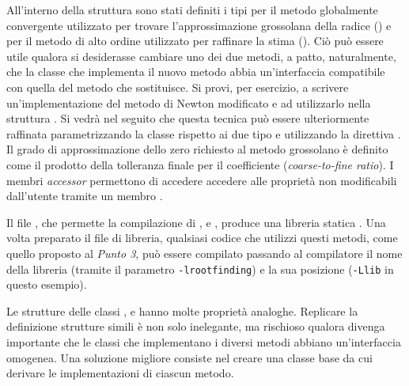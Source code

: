 \begin{enumerate}
        All'interno della struttura  sono stati definiti i tipi
        per il metodo globalmente convergente utilizzato per trovare
        l'approssimazione grossolana della radice () e per il
        metodo di alto ordine utilizzato per raffinare la stima
        (). Ci\`o pu\`o essere utile qualora si desiderasse
        cambiare uno dei due metodi, a patto, naturalmente, che la classe che
        implementa il nuovo metodo abbia un'interfaccia compatibile con quella
        del metodo che sostituisce. Si provi, per esercizio, a scrivere
        un'implementazione del metodo di Newton modificato e ad utilizzarlo
        nella struttura . Si vedr\`a nel seguito che questa
        tecnica pu\`o essere ulteriormente raffinata parametrizzando la classe
         rispetto ai due tipo  e 
        utilizzando la direttiva .
        Il grado di approssimazione dello zero richiesto al metodo grossolano
        \`e definito come il prodotto della tolleranza finale  per il
        coefficiente  (\emph{coarse-to-fine ratio}).
        I membri \emph{accessor} permettono di accedere accedere alle
        propriet\`a non modificabili dall'utente tramite un membro .

        Il file , che permette la  compilazione di ,
         e , produce una libreria statica
        . Una volta preparato il file di libreria, qualsiasi
        codice che utilizzi questi metodi, come quello proposto al \emph{Punto 3}, pu\`o
        essere compilato passando al compilatore il nome della libreria (tramite il
        parametro \texttt{-lrootfinding}) e la sua posizione (\texttt{-Llib} in questo esempio).

        Le strutture delle classi ,
         e  hanno molte propriet\`a analoghe. Replicare
        la definizione strutture simili \`e non solo inelegante, ma rischioso
        qualora divenga importante %
        che le classi che implementano i diversi metodi abbiano un'interfaccia
        omogenea. Una soluzione migliore consiste nel creare una classe base
         da cui derivare le implementazioni di ciascun
        metodo.



\end{enumerate}
